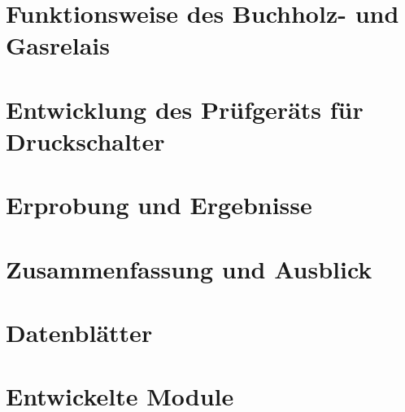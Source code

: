 \documentclass[12pt,a4paper,twoside]{report}
\begin{document}
\chapter{Funktionsweise des Buchholz- und Gasrelais}

\chapter{Entwicklung des Prüfgeräts für Druckschalter}

\chapter{Erprobung und Ergebnisse}

\chapter{Zusammenfassung und Ausblick}

\printbibliography

\appendix

\chapter{Datenblätter}
\newpage

\chapter{Entwickelte Module}
\end{document}
